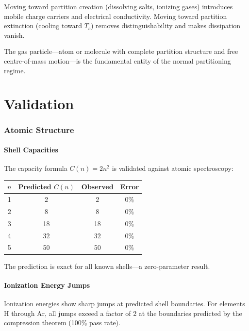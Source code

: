 \documentclass[twocolumn,10pt,a4paper]{article}
\theoremstyle{plain}
\theoremstyle{definition}
\theoremstyle{remark}
\begin{document}
Moving toward partition creation (dissolving salts, ionizing gases) introduces mobile charge carriers and electrical conductivity. Moving toward partition extinction (cooling toward $T_c$) removes distinguishability and makes dissipation vanish.

The gas particle---atom or molecule with complete partition structure and free centre-of-mass motion---is the fundamental entity of the normal partitioning regime.


\part{Validation}
\label{part:validation}

\section{Atomic Structure}
\label{sec:val_atomic}

\subsection{Shell Capacities}

The capacity formula $C(n) = 2n^2$ is validated against atomic spectroscopy:

\begin{center}
\begin{tabular}{cccc}
\toprule
$n$ & Predicted $C(n)$ & Observed & Error \\
\midrule
1 & 2 & 2 & 0\% \\
2 & 8 & 8 & 0\% \\
3 & 18 & 18 & 0\% \\
4 & 32 & 32 & 0\% \\
5 & 50 & 50 & 0\% \\
\bottomrule
\end{tabular}
\end{center}

The prediction is exact for all known shells---a zero-parameter result.

\subsection{Ionization Energy Jumps}

Ionization energies show sharp jumps at predicted shell boundaries. For elements H through Ar, all jumps exceed a factor of 2 at the boundaries predicted by the compression theorem (100\% pass rate).
\end{document}
